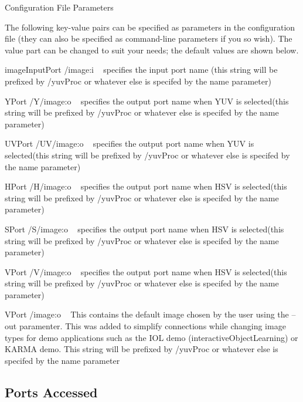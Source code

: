 Configuration File Parameters

The following key-\/value pairs can be specified as parameters in the configuration file (they can also be specified as command-\/line parameters if you so wish). The value part can be changed to suit your needs; the default values are shown below.


\begin{DoxyItemize}
\item {\ttfamily image\+Input\+Port} {\ttfamily /image}\+:i ~\newline
 specifies the input port name (this string will be prefixed by {\ttfamily /yuv\+Proc} or whatever else is specifed by the name parameter)
\item {\ttfamily Y\+Port} {\ttfamily /\+Y/image}\+:o ~\newline
 specifies the output port name when Y\+UV is selected(this string will be prefixed by {\ttfamily /yuv\+Proc} or whatever else is specifed by the name parameter)
\item {\ttfamily U\+V\+Port} {\ttfamily /\+U\+V/image}\+:o ~\newline
 specifies the output port name when Y\+UV is selected(this string will be prefixed by {\ttfamily /yuv\+Proc} or whatever else is specifed by the name parameter)
\item {\ttfamily H\+Port} {\ttfamily /\+H/image}\+:o ~\newline
 specifies the output port name when H\+SV is selected(this string will be prefixed by {\ttfamily /yuv\+Proc} or whatever else is specifed by the name parameter)
\item {\ttfamily S\+Port} {\ttfamily /\+S/image}\+:o ~\newline
 specifies the output port name when H\+SV is selected(this string will be prefixed by {\ttfamily /yuv\+Proc} or whatever else is specifed by the name parameter)
\item {\ttfamily V\+Port} {\ttfamily /\+V/image}\+:o ~\newline
 specifies the output port name when H\+SV is selected(this string will be prefixed by {\ttfamily /yuv\+Proc} or whatever else is specifed by the name parameter)
\item {\ttfamily V\+Port} {\ttfamily /image}\+:o ~\newline
 This contains the default image chosen by the user using the --out paramenter. This was added to simplify connections while changing image types for demo applications such as the I\+OL demo (interactive\+Object\+Learning) or K\+A\+R\+MA demo. This string will be prefixed by {\ttfamily /yuv\+Proc} or whatever else is specifed by the name parameter
\end{DoxyItemize}\hypertarget{group__lumaChroma_portsa_sec}{}\subsection{Ports Accessed}\label{group__lumaChroma_portsa_sec}

